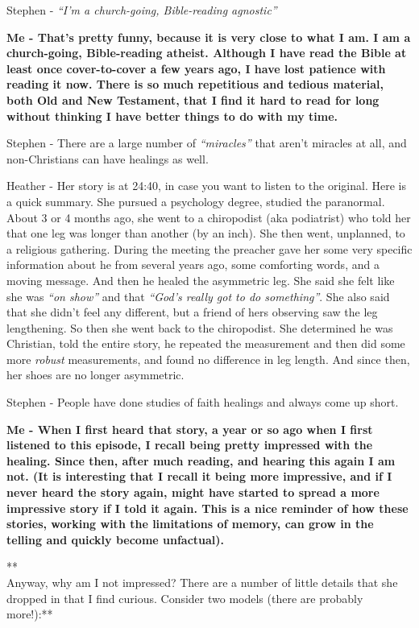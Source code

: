 Stephen - \emph{``I'm a church-going, Bible-reading agnostic''}

\textbf{Me - That's pretty funny, because it is very close to what I am.
I am a church-going, Bible-reading atheist. Although I have read the
Bible at least once cover-to-cover a few years ago, I have lost patience
with reading it now. There is so much repetitious and tedious material,
both Old and New Testament, that I find it hard to read for long without
thinking I have better things to do with my time.\\}

Stephen - There are a large number of \emph{``miracles''} that aren't
miracles at all, and non-Christians can have healings as well.

Heather - Her story is at 24:40, in case you want to listen to the
original. Here is a quick summary. She pursued a psychology degree,
studied the paranormal. About 3 or 4 months ago, she went to a
chiropodist (aka podiatrist) who told her that one leg was longer than
another (by an inch). She then went, unplanned, to a religious
gathering. During the meeting the preacher gave her some very specific
information about he from several years ago, some comforting words, and
a moving message. And then he healed the asymmetric leg. She said she
felt like she was \emph{``on show''} and that \emph{``God's really got
to do something''}. She also said that she didn't feel any different,
but a friend of hers observing saw the leg lengthening. So then she went
back to the chiropodist. She determined he was Christian, told the
entire story, he repeated the measurement and then did some more
\emph{robust} measurements, and found no difference in leg length. And
since then, her shoes are no longer asymmetric.

Stephen - People have done studies of faith healings and always come up
short.

\textbf{Me - When I first heard that story, a year or so ago when I
first listened to this episode, I recall being pretty impressed with the
healing. Since then, after much reading, and hearing this again I am
not. (It is interesting that I recall it being more impressive, and if I
never heard the story again, might have started to spread a more
impressive story if I told it again. This is a nice reminder of how
these stories, working with the limitations of memory, can grow in the
telling and quickly become unfactual).\\}

**\\Anyway, why am I not impressed? There are a number of little details
that she dropped in that I find curious. Consider two models (there are
probably more!):**

